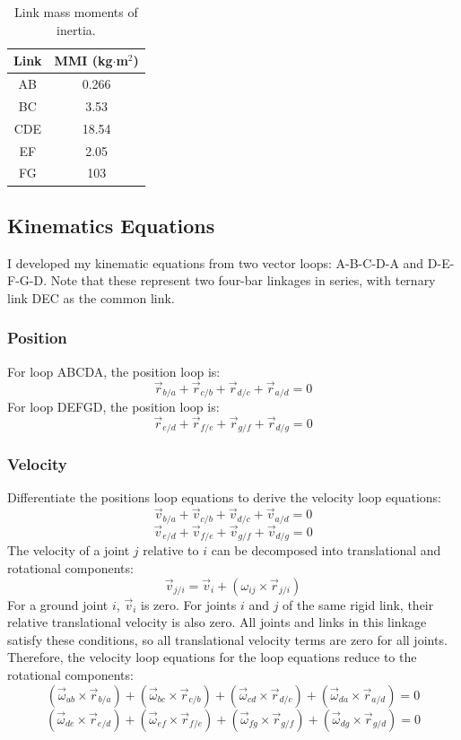\documentclass[12pt]{article}
\begin{document}
\begin{table}[H] %
  \begin{center}
    \begin{tabular}{ c|c }  %
      Link & MMI (kg$\cdot$m$^{2}$) \\
      \hline
      AB & 0.266   \\
      BC & 3.53   \\
      CDE & 18.54   \\
      EF & 2.05 \\
      FG & 103 \\
    \end{tabular}
  \end{center}\caption{Link mass moments of inertia.}\label{tab:link-mmi}
\end{table}

\subsection{Kinematics Equations}%
\label{eqns.kinematics}

I developed my kinematic equations from two vector loops: A-B-C-D-A and D-E-F-G-D. Note that these represent two four-bar linkages in series, with ternary link DEC as the common link.

\subsubsection{Position}%
\label{eqns.kinematics.position}

For loop ABCDA, the position loop is:
\[ \vec{r}_{b/a} + \vec{r}_{c/b} + \vec{r}_{d/c} + \vec{r}_{a/d} = 0 \]
For loop DEFGD, the position loop is:
\[ \vec{r}_{e/d} + \vec{r}_{f/e} + \vec{r}_{g/f} + \vec{r}_{d/g} = 0 \]

\subsubsection{Velocity}%
\label{eqns.kinematics.velocity}

Differentiate the positions loop equations to derive the velocity loop equations:
\[ \vec{v}_{b/a} + \vec{v}_{c/b} + \vec{v}_{d/c} + \vec{v}_{a/d} = 0 \]
\[ \vec{v}_{e/d} + \vec{v}_{f/e} + \vec{v}_{g/f} + \vec{v}_{d/g} = 0 \]
The velocity of a joint $j$ relative to $i$ can be decomposed into translational and rotational components:
\[ \vec{v}_{j/i} = \vec{v}_{i} + (\omega_{ij}\times \vec{r}_{j/i}) \]
For a ground joint $i$, $\vec{v}_{i}$ is zero. For joints $i$ and $j$ of the same rigid link, their relative translational velocity is also zero. All joints and links in this linkage satisfy these conditions, so all translational velocity terms are zero for all joints. Therefore, the velocity loop equations for the loop equations reduce to the rotational components:
\[ (\vec{\omega}_{ab}\times \vec{r}_{b/a}) + (\vec{\omega}_{bc}\times \vec{r}_{c/b}) + (\vec{\omega}_{cd}\times \vec{r}_{d/c}) + (\vec{\omega}_{da}\times \vec{r}_{a/d}) = 0 \]
\[ (\vec{\omega}_{de}\times \vec{r}_{e/d}) + (\vec{\omega}_{ef}\times \vec{r}_{f/e}) + (\vec{\omega}_{fg}\times \vec{r}_{g/f}) + (\vec{\omega}_{dg}\times \vec{r}_{g/d}) = 0 \]\\
\end{document}
